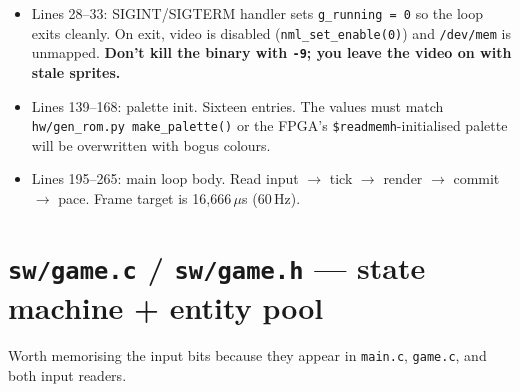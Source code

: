 \documentclass[11pt,letterpaper]{article}
\begin{document}
\begin{itemize}[leftmargin=*]
  \item Lines 28--33: SIGINT/SIGTERM handler sets \texttt{g\_running = 0}
    so the loop exits cleanly. On exit, video is disabled
    (\texttt{nml\_set\_enable(0)}) and \texttt{/dev/mem} is unmapped.
    \textbf{Don't kill the binary with \texttt{-9}; you leave the video on
    with stale sprites.}
  \item Lines 139--168: palette init. Sixteen entries. The values must
    match \texttt{hw/gen\_rom.py make\_palette()} or the FPGA's
    \texttt{\$readmemh}-initialised palette will be overwritten with bogus
    colours.
  \item Lines 195--265: main loop body. Read input $\to$ tick $\to$ render
    $\to$ commit $\to$ pace. Frame target is 16{,}666\,$\mu$s (60\,Hz).
\end{itemize}

\section{\texttt{sw/game.c} / \texttt{sw/game.h} --- state machine + entity pool}

Worth memorising the input bits because they appear in \texttt{main.c},
\texttt{game.c}, and both input readers.
\end{document}
